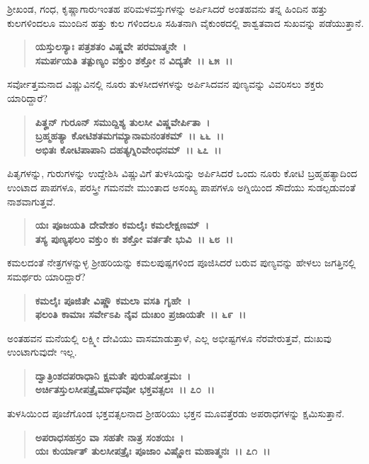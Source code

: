 ಶ‍್ರೀಖಂಡ, ಗಂಧ, ಕೃಷ್ಣಾಗಾರುಇಂತಹ ಪರಿಮಳವಸ್ತುಗಳನ್ನು ಅರ್ಪಿಸಿದರೆ ಅಂತಹವನು ತನ್ನ ಹಿಂದಿನ ಹತ್ತು ಕುಲಗಳಿಂದಲೂ ಮುಂದಿನ ಹತ್ತು ಕುಲ ಗಳಿಂದಲೂ ಸಹಿತನಾಗಿ ವೈಕುಂಠದಲ್ಲಿ ಶಾಶ್ವತವಾದ ಸುಖವನ್ನು ಪಡೆಯುತ್ತಾನೆ.

\begin{verse}
\textbf{ಯಸ್ತುಲಸ್ಯಾಃ ಪತ್ರಶತಂ ವಿಷ್ಣವೇ ಪರಮಾತ್ಮನೇ~।}\\\textbf{ಸಮರ್ಪಯತಿ ತತ್ಪುಣ್ಯಂ ವಕ್ತುಂ ಶಕ್ತೋ ನ ವಿದ್ಯತೇ~।। ೬೫~।।}
\end{verse}

ಸರ್ವೋತ್ತಮನಾದ ವಿಷ್ಣುವಿನಲ್ಲಿ ನೂರು ತುಳಸೀದಳಗಳನ್ನು ಅರ್ಪಿಸಿದವನ ಪುಣ್ಯವನ್ನು ವಿವರಿಸಲು ಶಕ್ತರು ಯಾರಿದ್ದಾರೆ?

\begin{verse}
\textbf{ಪಿತೄನ್ ಗುರೂನ್ ಸಮುದ್ದಿಶ್ಯ ತುಲಸೀ ವಿಷ್ಣವೇರ್ಪಿತಾ~।}\\\textbf{ಬ್ರಹ್ಮಹತ್ಯಾ ಕೋಟಿಶತಮಗಮ್ಯಾನಾಮನಂತಕಮ್~।। ೬೬~।।}\\\textbf{ಅಭಿತಃ ಕೋಟಿಪಾಪಾನಿ ದಹತ್ಯಗ್ನಿರಿವೇಂಧನಮ್~।। ೬೭~।।}
\end{verse}

ಪಿತೃಗಳನ್ನು, ಗುರುಗಳನ್ನು ಉದ್ದೇಶಿಸಿ ವಿಷ್ಣುವಿಗೆ ತುಳಸಿಯನ್ನು ಅರ್ಪಿಸಿದರೆ ಒಂದು ನೂರು ಕೋಟಿ ಬ್ರಹ್ಮಹತ್ಯಾದಿಂದ ಉಂಟಾದ ಪಾಪಗಳೂ, ಪರಸ್ತ್ರೀ ಗಮನವೇ ಮುಂತಾದ ಅಸಂಖ್ಯ ಪಾಪಗಳೂ ಅಗ್ನಿಯಿಂದ ಸೌದೆಯು ಸುಡಲ್ಪಡುವಂತೆ ನಾಶವಾಗುತ್ತವೆ.

\begin{verse}
\textbf{ಯಃ ಪೂಜಯತಿ ದೇವೇಶಂ ಕಮಲೈಃ ಕಮಲೇಕ್ಷಣಮ್~।}\\\textbf{ತಸ್ಯ ಪುಣ್ಯಫಲಂ ವಕ್ತುಂ ಕಃ ಶಕ್ತೋ ವರ್ತತೇ ಭುವಿ~।। ೬೮~।।}
\end{verse}

ಕಮಲದಂತೆ ನೇತ್ರಗಳನ್ನುಳ್ಳ ಶ‍್ರೀಹರಿಯನ್ನು ಕಮಲಪುಷ್ಪಗಳಿಂದ ಪೂಜಿಸಿದರೆ ಬರುವ ಪುಣ್ಯವನ್ನು ಹೇಳಲು ಜಗತ್ತಿನಲ್ಲಿ ಸಮರ್ಥರು ಯಾರಿದ್ದಾರೆ?

\begin{verse}
\textbf{ಕಮಲೈಃ ಪೂಜಿತೇ ವಿಷ್ಣೌ ಕಮಲಾ ವಸತಿ ಗೃಹೇ~।}\\\textbf{ಫಲಂತಿ ಕಾಮಾಃ ಸರ್ವೇಽಪಿ ನೈವ ದುಃಖಂ ಪ್ರಜಾಯತೇ~।। ೬೯~।।}
\end{verse}

ಅಂತಹವನ ಮನೆಯಲ್ಲಿ ಲಕ್ಷ್ಮೀ ದೇವಿಯು ವಾಸಮಾಡುತ್ತಾಳೆ, ಎಲ್ಲ ಅಭೀಷ್ಟಗಳೂ ನೆರವೇರುತ್ತವೆ, ದುಃಖವು ಉಂಟಾಗುವುದೇ ಇಲ್ಲ.

\begin{verse}
\textbf{ದ್ವಾತ್ರಿಂಶದಪರಾಧಾನಿ ಕ್ಷಮತೇ ಪುರುಷೋತ್ತಮಃ~।}\\\textbf{ಅರ್ಚಿತಸ್ತುಲಸೀಪತ್ರೈರ್ಮಾಧವೋ ಭಕ್ತವತ್ಸಲಃ~।। ೭೦~।।}
\end{verse}

ತುಳಸಿಯಿ೦ದ ಪೂಜೆಗೊಂಡ ಭಕ್ತವತ್ಸಲನಾದ ಶ‍್ರೀಹರಿಯು ಭಕ್ತನ ಮೂವತ್ತೆರಡು ಅಪರಾಧಗಳನ್ನು ಕ್ಷಮಿಸುತ್ತಾನೆ.

\begin{verse}
\textbf{ಅಪರಾಧಸಹಸ್ರಂ ವಾ ಸಹತೇ ನಾತ್ರ ಸಂಶಯಃ~।}\\\textbf{ಯಃ ಕುರ್ಯಾತ್ ತುಲಸೀಪತ್ರೈಃ ಪೂಜಾಂ ವಿಷ್ಣೋಃ ಮಹಾತ್ಮನಃ~।। ೭೧~।।}
\end{verse}

